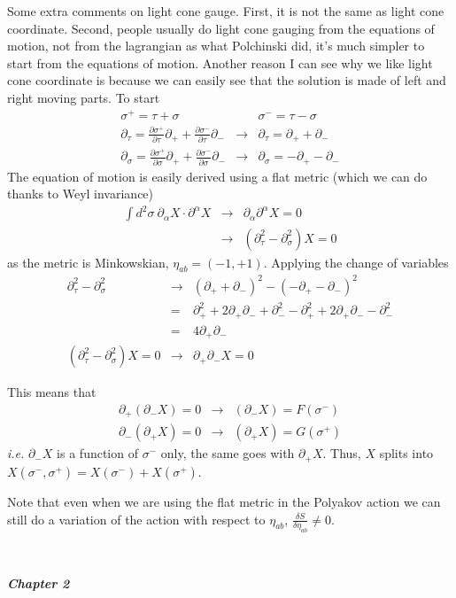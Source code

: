 \documentclass[aps,preprint,preprintnumbers,nofootinbib,showpacs,prd]{revtex4-1}
\newcommand{\ie}{{\it i.e.} }
\newcommand{\nbea}{\begin{eqnarray*}}
\newcommand{\neea}{\end{eqnarray*}}
\begin{document}
Some extra comments on light cone gauge. First, it is not the same as light cone coordinate. Second, people usually do light cone gauging from the equations of motion, not from the lagrangian as what Polchinski did, it's much simpler to start from the equations of motion. Another reason I can see why we like light cone coordinate is because we can easily see that the solution is made of left and right moving parts. To start
%
\nbea
\sigma^+ = \tau + \sigma & ~ & \sigma^- = \tau - \sigma \\
\partial_\tau = \frac{\partial \sigma^+}{\partial \tau} \partial_+ + \frac{\partial \sigma^-}{\partial \tau} \partial_- & \rightarrow & \partial_\tau = \partial_+ + \partial_- \\
\partial_\sigma = \frac{\partial \sigma^+}{\partial \sigma} \partial_+ + \frac{\partial \sigma^-}{\partial \sigma} \partial_- & \rightarrow & \partial_\sigma = -\partial_+ - \partial_-
\neea
%
The equation of motion is easily derived using a flat metric (which we can do thanks to Weyl invariance)
%
\nbea
\int d^2\sigma~ \partial_\alpha X \cdot \partial^\alpha X & \rightarrow & \partial_\alpha \partial^\alpha X = 0 \\
& \rightarrow & (\partial_\tau^2 - \partial_\sigma^2 ) X = 0
\neea
%
as the metric is Minkowskian, $\eta_{ab} = (-1, +1)$. Applying the change of variables
%
\nbea
\partial_\tau^2 - \partial_\sigma^2  & \rightarrow & (\partial_+ + \partial_-)^2 - (-\partial_+ - \partial_-)^2 \\
& = & \partial_+^2 + 2\partial_+ \partial_- + \partial_-^2 -\partial_+^2 + 2\partial_+ \partial_- - \partial_-^2 \\
& = & 4 \partial_+\partial_- \\
(\partial_\tau^2 - \partial_\sigma^2 ) X = 0 & \rightarrow & \partial_+\partial_- X = 0
\neea
%

This means that
%
\nbea
\partial_+ (\partial_-X) = 0 & \rightarrow & (\partial_-X) = F (\sigma^-) \\
\partial_- (\partial_+X) = 0 & \rightarrow & (\partial_+X) = G (\sigma^+)
\neea 
%
\ie $\partial_- X$ is a function of $\sigma^-$ only, the same goes with $\partial_+X$. Thus, $X$ splits into $X(\sigma^-,\sigma^+) = X(\sigma^-) + X(\sigma^+)$.

Note that even when we are using the flat metric in the Polyakov action we can still do a variation of the action with respect to $\eta_{ab}$, $\frac{\delta S}{\delta \eta_{ab}} \neq 0$.

{\ }

\textbf{\textit {Chapter 2}}
\end{document}
